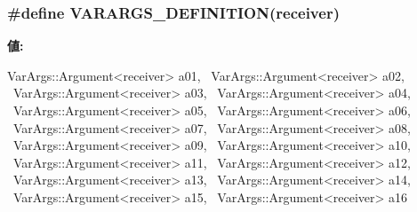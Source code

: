 \hypertarget{varargs_8hh_a6fac18ef6eec218a6a657001dd34df92}{
\subsubsection[{VARARGS\_\-DEFINITION}]{\setlength{\rightskip}{0pt plus 5cm}\#define VARARGS\_\-DEFINITION(receiver)}}
\label{varargs_8hh_a6fac18ef6eec218a6a657001dd34df92}
{\bfseries 値:}
\begin{DoxyCode}
VarArgs::Argument<receiver> a01, \
    VarArgs::Argument<receiver> a02, \
    VarArgs::Argument<receiver> a03, \
    VarArgs::Argument<receiver> a04, \
    VarArgs::Argument<receiver> a05, \
    VarArgs::Argument<receiver> a06, \
    VarArgs::Argument<receiver> a07, \
    VarArgs::Argument<receiver> a08, \
    VarArgs::Argument<receiver> a09, \
    VarArgs::Argument<receiver> a10, \
    VarArgs::Argument<receiver> a11, \
    VarArgs::Argument<receiver> a12, \
    VarArgs::Argument<receiver> a13, \
    VarArgs::Argument<receiver> a14, \
    VarArgs::Argument<receiver> a15, \
    VarArgs::Argument<receiver> a16
\end{DoxyCode}
